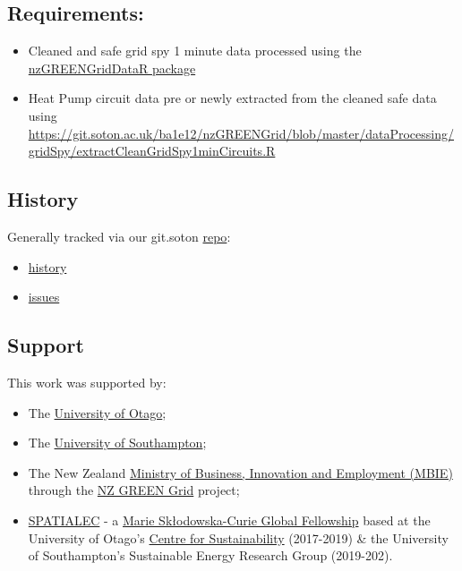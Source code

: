 \documentclass[]{article}
\providecommand{\tightlist}{%
  \setlength{\itemsep}{0pt}\setlength{\parskip}{0pt}}
\begin{document}
\subsection{Requirements:}\label{requirements}

\begin{itemize}
\tightlist
\item
  Cleaned and safe grid spy 1 minute data processed using the
  \href{https://github.com/dataknut/nzGREENGridDataR/tree/master/dataProcessing/gridSpy}{nzGREENGridDataR
  package}
\item
  Heat Pump circuit data pre or newly extracted from the cleaned safe
  data using
  \url{https://git.soton.ac.uk/ba1e12/nzGREENGrid/blob/master/dataProcessing/gridSpy/extractCleanGridSpy1minCircuits.R}
\end{itemize}

\subsection{History}\label{history}

Generally tracked via our git.soton
\href{https://git.soton.ac.uk/ba1e12/nzGREENGrid}{repo}:

\begin{itemize}
\tightlist
\item
  \href{https://git.soton.ac.uk/ba1e12/nzGREENGrid/tree/master/analysis/profiles}{history}
\item
  \href{https://git.soton.ac.uk/ba1e12/nzGREENGrid/issues}{issues}
\end{itemize}

\subsection{Support}\label{support}

This work was supported by:

\begin{itemize}
\tightlist
\item
  The \href{https://www.otago.ac.nz/}{University of Otago};
\item
  The \href{https://www.southampton.ac.uk/}{University of Southampton};
\item
  The New Zealand \href{http://www.mbie.govt.nz/}{Ministry of Business,
  Innovation and Employment (MBIE)} through the
  \href{https://www.otago.ac.nz/centre-sustainability/research/energy/otago050285.html}{NZ
  GREEN Grid} project;
\item
  \href{http://www.energy.soton.ac.uk/tag/spatialec/}{SPATIALEC} - a
  \href{http://ec.europa.eu/research/mariecurieactions/about-msca/actions/if/index_en.htm}{Marie
  Skłodowska-Curie Global Fellowship} based at the University of Otago's
  \href{http://www.otago.ac.nz/centre-sustainability/staff/otago673896.html}{Centre
  for Sustainability} (2017-2019) \& the University of Southampton's
  Sustainable Energy Research Group (2019-202).
\end{itemize}
\end{document}
